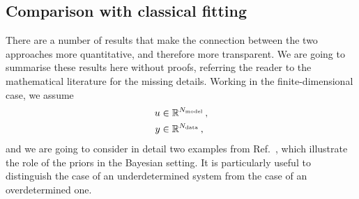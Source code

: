 \subsection{Comparison with classical fitting}
\label{sec:comp-class-fit}

There are a number of results that make the connection between the two
approaches more quantitative, and therefore more transparent. We are going to
summarise these results here without proofs, referring the reader to the
mathematical literature for the missing details. Working in the
finite-dimensional case, we assume 
\begin{align*}
  u &\in \mathbb{R}^{N_{\rm model}} \, ,\\
  y &\in \mathbb{R}^{N_{\rm data}}\, ,
\end{align*}
and we are going to consider in detail two examples from Ref.~\cite{StuartCore},
which illustrate the role of the priors in the Bayesian setting. It is
particularly useful to distinguish the case of an underdetermined system from
the case of an overdetermined one. 

